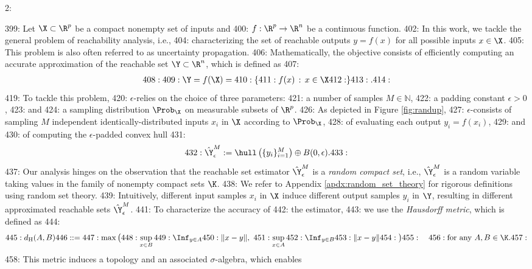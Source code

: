 2: \documentclass[12pt]{l4dc2022} %
\begin{document}
399: Let $\X\subset\R^p$ be a compact nonempty set of inputs and  
400: $f:\R^p\rightarrow\R^n$ be a continuous function. 
402: In this work, we tackle the general problem of reachability analysis, i.e., %
404: characterizing the set of reachable outputs $y=f(x)$ for all possible inputs $x\in\X$. 
405: This problem is also often referred to as uncertainty propagation. %
406: Mathematically, the objective consists of efficiently computing an accurate approximation of the reachable set $\Y\subset\R^n$, which is defined as 
407: \begin{align}
408: \label{eq:reach_set}
409: \Y = f(\X) =
410: \{ 
411: 	f(x) \, :\, x\in\X
412: \}
413: .
414: \end{align}
419: To tackle this problem, 
420: $\epsilon$-\randup relies on the choice of three parameters: 
421: a number of samples $M\in\mathbb{N}$, 
422: a padding constant $\epsilon>0$, 
423: and 
424: a sampling distribution $\Prob_\X$ on measurable subsets of $\R^{p}$. 
426: As depicted in Figure \ref{fig:randup}, %
427: $\epsilon$-\randup consists of sampling $M$ independent identically-distributed inputs $x_i$ in $\X$ according to $\Prob_\X$, 
428: of evaluating each output $y_i=f(x_i)$, %
429: and 
430: of computing the $\epsilon$-padded convex hull 
431: \begin{equation}\label{eq:estimator_eps}
432: \hat\Y_\epsilon^M:=\hull\left(\{y_i\}_{i{=}1}^M\right)\oplus B(0,\epsilon).
433: \end{equation}
437: Our analysis hinges on the observation that the reachable set estimator $\hat\Y_\epsilon^M$ is a \textit{random compact set}, i.e., $\hat\Y_\epsilon^M$ is a random variable taking values in the family of nonempty compact sets $\K$.  
438: We refer to Appendix \ref{apdx:random_set_theory} for rigorous definitions using random set theory. 
439: Intuitively, different input samples $x_i$ in $\X$ induce different output samples $y_i$ in $\Y$, resulting in  different approximated reachable sets $\hat\Y_\epsilon^M$.  
441: To characterize the accuracy of
442: the estimator,
443: we use the \textit{Hausdorff metric}, which is defined as 
444: \begin{equation}\label{eq:metric:Hausdorf}
445: d_\textrm{H}(A,B)
446: :=
447: \max\big(
448: \sup_{x\in B}
449: \Inf_{y\in A}
450: \|x-y\|, \
451: \sup_{x\in A}
452: \Inf_{y\in B}
453: \|x-y\|
454: \big)
455: \quad
456: \text{for any $A,B\in\K$.}
457: \end{equation}
458: This metric induces a topology and an associated $\sigma$-algebra, which enables 
\end{document}
